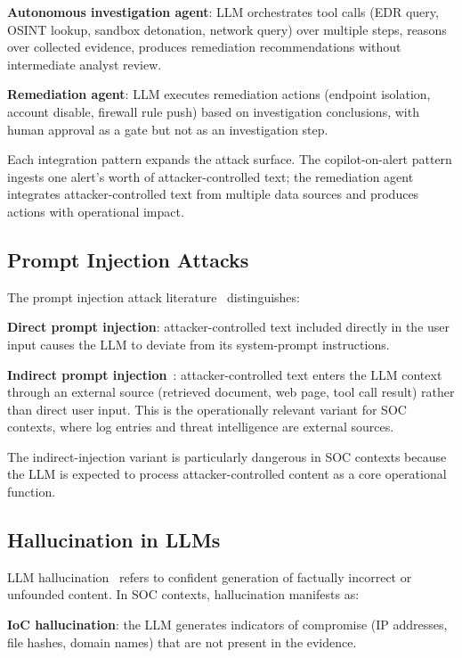 \documentclass[sigconf,nonacm]{acmart}
\begin{document}
\textbf{Autonomous investigation agent}: LLM orchestrates
tool calls (EDR query, OSINT lookup, sandbox detonation,
network query) over multiple steps, reasons over collected
evidence, produces remediation recommendations without
intermediate analyst review.

\textbf{Remediation agent}: LLM executes remediation actions
(endpoint isolation, account disable, firewall rule push) based
on investigation conclusions, with human approval as a gate but
not as an investigation step.

Each integration pattern expands the attack surface. The
copilot-on-alert pattern ingests one alert's worth of
attacker-controlled text; the remediation agent integrates
attacker-controlled text from multiple data sources and
produces actions with operational impact.

\subsection{Prompt Injection Attacks}

The prompt injection attack
literature~\cite{perez2022promptinjection,greshake2023indirect,
liu2024promptinjsurvey} distinguishes:

\textbf{Direct prompt injection}: attacker-controlled text
included directly in the user input causes the LLM to deviate
from its system-prompt instructions.

\textbf{Indirect prompt injection}~\cite{greshake2023indirect}:
attacker-controlled text enters the LLM context through an
external source (retrieved document, web page, tool call result)
rather than direct user input. This is the operationally
relevant variant for SOC contexts, where log entries and threat
intelligence are external sources.

The indirect-injection variant is particularly dangerous in SOC
contexts because the LLM is expected to process attacker-controlled
content as a core operational function.

\subsection{Hallucination in LLMs}

LLM hallucination~\cite{huang2023hallucination,ji2023hallucination}
refers to confident generation of factually incorrect or
unfounded content. In SOC contexts, hallucination manifests as:

\textbf{IoC hallucination}: the LLM generates indicators of
compromise (IP addresses, file hashes, domain names) that are
not present in the evidence.
\end{document}
